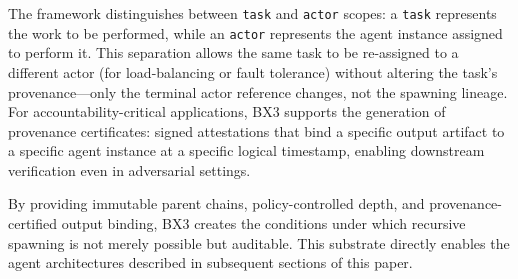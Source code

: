 The framework distinguishes between \texttt{task} and \texttt{actor} scopes: a \texttt{task} represents the work to be performed, while an \texttt{actor} represents the agent instance assigned to perform it. This separation allows the same task to be re-assigned to a different actor (for load-balancing or fault tolerance) without altering the task's provenance—only the terminal actor reference changes, not the spawning lineage. For accountability-critical applications, BX3 supports the generation of provenance certificates: signed attestations that bind a specific output artifact to a specific agent instance at a specific logical timestamp, enabling downstream verification even in adversarial settings.

By providing immutable parent chains, policy-controlled depth, and provenance-certified output binding, BX3 creates the conditions under which recursive spawning is not merely possible but auditable. This substrate directly enables the agent architectures described in subsequent sections of this paper.